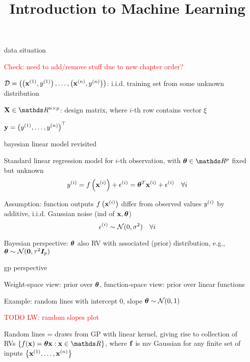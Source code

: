 \documentclass[11pt,compress,t,notes=noshow, xcolor=table]{beamer}
\title{Introduction to Machine Learning}
\begin{document}


\begin{framei}{data situation}
\item \textcolor{red}{Check: need to add/remove stuff due to new chapter order?}
\item $\mathcal{D} = \left( \left(\mathbf{x}^{(1)}, y^{(1)}\right), \ldots, \left(\mathbf{x}^{(n)}, y^{(n)}\right)\right)$: i.i.d. training set from some unknown distribution
\item $\Xmat \in \R^{n \times p}$: design matrix, where $i$-th row contains vector $\xi$
\item $\mathbf{y} = \left(y^{(1)}, \hdots, y^{(n)}\right)^\top$
\end{framei}

\begin{framei}[sep=L]{bayesian linear model revisited}
\item Standard linear regression model for $i$-th observation, with $\thetav \in \R^p$ fixed but unknown
$$y^{(i)} = f\left(\mathbf{x}^{(i)}\right) + \epsilon^{(i)} = \bm{\theta}^T \mathbf{x}^{(i)} + \epsilon^{(i)} \quad \forall i$$
\item Assumption: function outputs $f\left(\mathbf{x}^{(i)}\right)$ differ from observed values $y^{(i)}$ by additive, i.i.d. Gaussian noise (ind of $\mathbf{x}, \bm{\theta}$)
$$\epsilon^{(i)} \sim \mathcal{N}(0, \sigma^2) \quad \forall i$$ 
\item Bayesian perspective: $\bm{\theta}$ also RV with associated (prior) distribution, e.g., $\bm{\theta} \sim \mathcal{N}(\mathbf{0}, \tau^2 \bm{I}_p)$
\end{framei}

\begin{framei}{gp perspective}
\item Weight-space view: prior over $\bm{\theta}$, function-space view: prior over linear functions
\item Example: random lines with intercept 0, slope $\bm{\theta} \sim \mathcal{N}(0, 1)$

\textcolor{red}{TODO LW: random slopes plot}
\item Random lines = draws from GP with linear kernel, giving rise to collection of RVs $\{ \fx = \thetav \xv: \xv \in \R\}$, where $\mathbf{f}$ is mv Gaussian for any finite set of inputs $\left\{ \mathbf{x}^{(1)}, \ldots, \mathbf{x}^{(n)}\right\}$
\end{framei}
\end{document}
